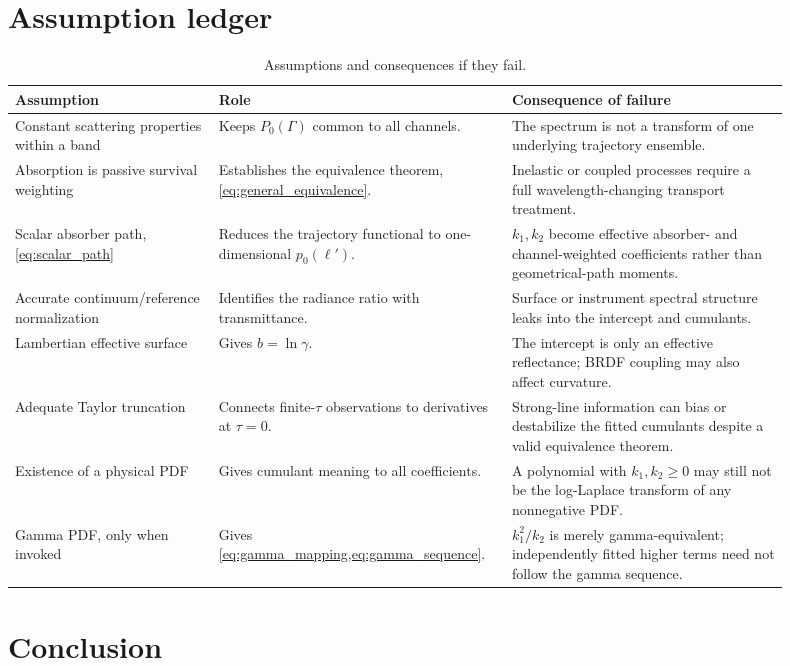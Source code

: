 \documentclass[11pt]{article}
\newcommand{\lp}{\ell'}
\begin{document}
\section{Assumption ledger}

\begin{table}[ht]
\centering
\small
\caption{Assumptions and consequences if they fail.}
\begin{tabular}{p{0.25\linewidth}p{0.31\linewidth}p{0.34\linewidth}}
\toprule
Assumption & Role & Consequence of failure \\
\midrule
Constant scattering properties within a band & Keeps $P_0(\Gamma)$ common to
all channels. & The spectrum is not a transform of one underlying trajectory
ensemble. \\
Absorption is passive survival weighting & Establishes the equivalence theorem,
\cref{eq:general_equivalence}. & Inelastic or coupled processes require a full
wavelength-changing transport treatment. \\
Scalar absorber path, \cref{eq:scalar_path} & Reduces the trajectory functional
to one-dimensional $p_0(\lp)$. & $k_1,k_2$ become effective absorber- and
channel-weighted coefficients rather than geometrical-path moments. \\
Accurate continuum/reference normalization & Identifies the radiance ratio with
transmittance. & Surface or instrument spectral structure leaks into the
intercept and cumulants. \\
Lambertian effective surface & Gives $b=\ln\gamma$. & The intercept is only an
effective reflectance; BRDF coupling may also affect curvature. \\
Adequate Taylor truncation & Connects finite-$\tau$ observations to derivatives
at $\tau=0$. & Strong-line information can bias or destabilize the fitted
cumulants despite a valid equivalence theorem. \\
Existence of a physical PDF & Gives cumulant meaning to all coefficients. & A
polynomial with $k_1,k_2\geq0$ may still not be the log-Laplace transform of any
nonnegative PDF. \\
Gamma PDF, only when invoked & Gives \cref{eq:gamma_mapping,eq:gamma_sequence}. &
$k_1^2/k_2$ is merely gamma-equivalent; independently fitted higher terms need
not follow the gamma sequence. \\
\bottomrule
\end{tabular}
\end{table}

\section{Conclusion}
\end{document}

